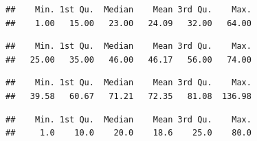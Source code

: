 \documentclass[
  10pt,
]{book}
\newenvironment{Shaded}{\begin{snugshade}}{\end{snugshade}}
\newcommand{\DecValTok}[1]{\textcolor[rgb]{0.00,0.00,0.81}{#1}}
\newcommand{\FunctionTok}[1]{\textcolor[rgb]{0.00,0.00,0.00}{#1}}
\newcommand{\NormalTok}[1]{#1}
\newcommand{\SpecialCharTok}[1]{\textcolor[rgb]{0.00,0.00,0.00}{#1}}
\begin{document}
\begin{verbatim}
##    Min. 1st Qu.  Median    Mean 3rd Qu.    Max. 
##    1.00   15.00   23.00   24.09   32.00   64.00
\end{verbatim}

\begin{Shaded}
\end{Shaded}

\begin{verbatim}
##    Min. 1st Qu.  Median    Mean 3rd Qu.    Max. 
##   25.00   35.00   46.00   46.17   56.00   74.00
\end{verbatim}

\begin{Shaded}
\end{Shaded}

\begin{verbatim}
##    Min. 1st Qu.  Median    Mean 3rd Qu.    Max. 
##   39.58   60.67   71.21   72.35   81.08  136.98
\end{verbatim}

\begin{Shaded}
\end{Shaded}

\begin{verbatim}
##    Min. 1st Qu.  Median    Mean 3rd Qu.    Max. 
##     1.0    10.0    20.0    18.6    25.0    80.0
\end{verbatim}

\begin{Shaded}
\end{Shaded}
\end{document}
